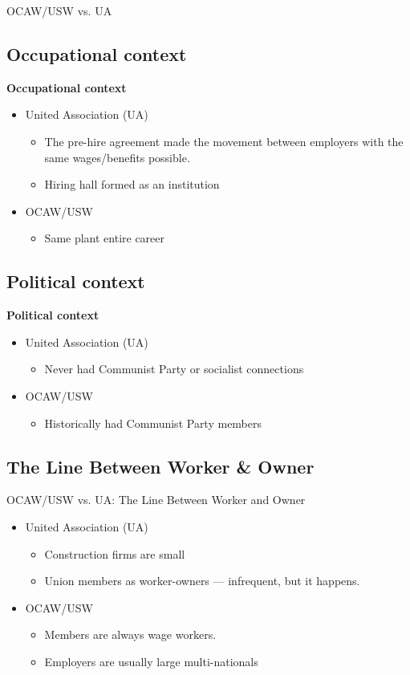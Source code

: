 \documentclass{beamer}
\begin{document}
\begin{frame}{OCAW/USW vs. UA}
\subsection{Occupational context}
\textbf{Occupational context}
	\begin{itemize}
		\item United Association (UA)
		\begin{itemize}
			\item The pre-hire agreement made the movement between employers with the same wages/benefits possible.
			\item Hiring hall formed as an institution
		\end{itemize}
		\item OCAW/USW
			\begin{itemize}
				\item Same plant entire career
			\end{itemize}
	\end{itemize}
\subsection{Political context}
\textbf{Political context}
	\begin{itemize}
		\item United Association (UA)
		\begin{itemize}
			\item Never had Communist Party or socialist connections
		\end{itemize}
		\item OCAW/USW
			\begin{itemize}
				\item Historically had Communist Party members
			\end{itemize}
	\end{itemize}
\end{frame}

\subsection{The Line Between Worker \& Owner}
\begin{frame}{OCAW/USW vs. UA: The Line Between Worker and Owner}
	\begin{itemize}
		\item United Association (UA)
		\begin{itemize}
			\item Construction firms are small
			\item Union members as worker-owners — infrequent, but it happens.
		\end{itemize}
		\item OCAW/USW
			\begin{itemize}
				\item Members are always wage workers.
				\item Employers are usually large multi-nationals
			\end{itemize}
	\end{itemize}
\end{frame}
\end{document}
